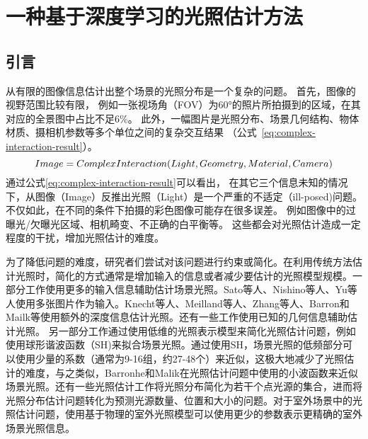 \chapter{一种基于深度学习的光照估计方法}\label{chap:illumination-estimation}
\section{引言}
从有限的图像信息估计出整个场景的光照分布是一个复杂的问题。
首先，图像的视野范围比较有限，
例如一张视场角（FOV）为60°的照片所拍摄到的区域，在其对应的全景图中占比不足6\%。
此外，一幅图片是光照分布、场景几何结构、物体材质、摄相机参数等多个单位之间的复杂交互结果
（公式~\ref{eq:complex-interaction-result}）。
\begin{equation} \centering \label{eq:complex-interaction-result}
Image = ComplexInteraction(Light, Geometry, Material, Camera)\end{equation}
通过公式\ref{eq:complex-interaction-result}可以看出，
在其它三个信息未知的情况下，从图像（Image）反推出光照（Light）是一个严重的不适定（ill-posed)问题。
不仅如此，在不同的条件下拍摄的彩色图像可能存在很多误差。
例如图像中的过曝光/欠曝光区域、相机畸变、不正确的白平衡等。
这些都会对光照估计造成一定程度的干扰，增加光照估计的难度。

为了降低问题的难度，研究者们尝试对该问题进行约束或简化。在利用传统方法估计光照时，简化的方式通常是增加输入的信息或者减少要估计的光照模型规模。一部分工作使用更多的输入信息辅助估计场景光照。Sato等人\cite{sato1999acquiring}、Nishino\cite{nishino2001determining}等人、Yu\cite{yu2006sparse}等人使用多张图片作为输入。Knecht\cite{knecht2012reciprocal}等人、Meilland\cite{meilland20133d}等人、Zhang等人\cite{zhang2016emptying}、Barron和Mailk\cite{barron2013intrinsic}等使用额外的深度信息估计光照。还有一些工作使用已知的几何信息辅助估计光照\cite{ramamoorthi2001signal, sato2003illumination, li2003multiple}。
另一部分工作通过使用低维的光照表示模型来简化光照估计问题，例如使用球形谐波函数（SH)来拟合场景光照\cite{ramamoorthi2001signal,kemelmacher20113d,garrido2013reconstructing,
knorr2014real,li2014intrinsic,barron2015shape, rematas2016deep}。通过使用SH，场景光照的低频部分可以使用少量的系数（通常为9-16组，约27-48个）来近似，这极大地减少了光照估计的难度，与之类似，Barronhe和Malik\cite{okabe2004spherical}在光照估计问题中使用的小波函数来近似场景光照。还有一些光照估计工作\cite{sato1999acquiring,  panagopoulos2011illumination, wang2002estimation, li2003multiple, sato2003illumination}将光照分布简化为若干个点光源的集合，进而将光照分布估计问题转化为预测光源数量、位置和大小的问题。对于室外场景中的光照估计问题，使用基于物理的室外光照模型\cite{lalonde2008does, lalonde2010sun, lalonde2012estimating, sunkavalli2008color}可以使用更少的参数表示更精确的室外场景光照信息。

